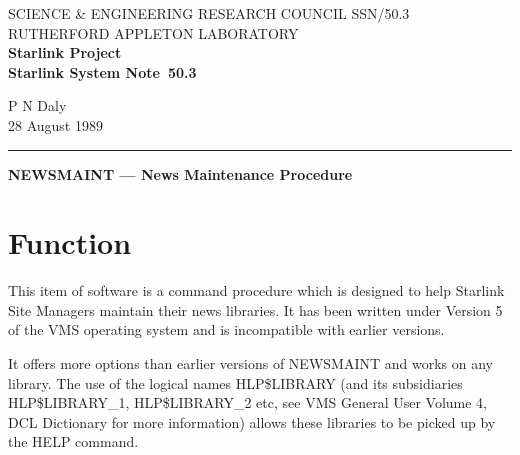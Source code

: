 \pagestyle{myheadings}

\newcommand{\stardoccategory}  {Starlink System Note}
\newcommand{\stardocinitials}  {SSN}
\newcommand{\stardocnumber}    {50.3}
\newcommand{\stardocauthors}   {P N Daly}
\newcommand{\stardocdate}      {28 August 1989}
\newcommand{\stardoctitle}     {NEWSMAINT --- News Maintenance Procedure}

\newcommand{\stardocname}{\stardocinitials /\stardocnumber}
\markright{\stardocname}
\setlength{\textwidth}{160mm}
\setlength{\textheight}{240mm}
\setlength{\topmargin}{-5mm}
\setlength{\oddsidemargin}{0mm}
\setlength{\evensidemargin}{0mm}
\setlength{\parindent}{0mm}
\setlength{\parskip}{\medskipamount}
\setlength{\unitlength}{1mm}


\thispagestyle{empty}
SCIENCE \& ENGINEERING RESEARCH COUNCIL \hfill \stardocname\\
RUTHERFORD APPLETON LABORATORY\\
{\large\bf Starlink Project\\}
{\large\bf \stardoccategory\ \stardocnumber}
\begin{flushright}
\stardocauthors\\
\stardocdate
\end{flushright}
\vspace{-4mm}
\rule{\textwidth}{0.5mm}
\vspace{5mm}
\begin{center}
{\Large\bf \stardoctitle}
\end{center}
\vspace{5mm}

\section{Function}

This item of software is a command procedure which is designed to help Starlink
Site Managers maintain their news libraries. It has been written under
Version 5 of the VMS operating system and is incompatible with earlier versions.

It offers more options than earlier versions of NEWSMAINT and works on any
library. The use of the logical names HLP\$LIBRARY  (and its subsidiaries
HLP\$LIBRARY\_1, HLP\$LIBRARY\_2 etc, see VMS General User Volume 4, DCL
Dictionary for more information) allows these libraries to be picked up by
the HELP command.


